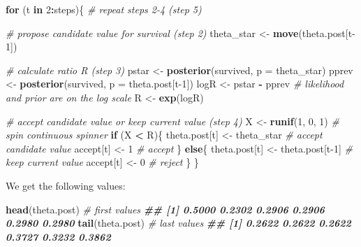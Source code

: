 \documentclass[
  12pt,
]{krantz}
\newenvironment{Shaded}{\begin{snugshade}}{\end{snugshade}}
\newcommand{\AttributeTok}[1]{\textcolor[rgb]{0.13,0.29,0.53}{#1}}
\newcommand{\CommentTok}[1]{\textcolor[rgb]{0.56,0.35,0.01}{\textit{#1}}}
\newcommand{\ControlFlowTok}[1]{\textcolor[rgb]{0.13,0.29,0.53}{\textbf{#1}}}
\newcommand{\DecValTok}[1]{\textcolor[rgb]{0.00,0.00,0.81}{#1}}
\newcommand{\DocumentationTok}[1]{\textcolor[rgb]{0.56,0.35,0.01}{\textbf{\textit{#1}}}}
\newcommand{\FunctionTok}[1]{\textcolor[rgb]{0.13,0.29,0.53}{\textbf{#1}}}
\newcommand{\NormalTok}[1]{#1}
\newcommand{\OtherTok}[1]{\textcolor[rgb]{0.56,0.35,0.01}{#1}}
\newcommand{\SpecialCharTok}[1]{\textcolor[rgb]{0.81,0.36,0.00}{\textbf{#1}}}
\begin{document}
\begin{Shaded}
\begin{Highlighting}[]
\ControlFlowTok{for}\NormalTok{ (t }\ControlFlowTok{in} \DecValTok{2}\SpecialCharTok{:}\NormalTok{steps)\{ }\CommentTok{\# repeat steps 2{-}4 (step 5)}
  
  \CommentTok{\# propose candidate value for survival (step 2)}
\NormalTok{  theta\_star }\OtherTok{\textless{}{-}} \FunctionTok{move}\NormalTok{(theta.post[t}\DecValTok{{-}1}\NormalTok{])}
  
  \CommentTok{\# calculate ratio R (step 3)}
\NormalTok{  pstar }\OtherTok{\textless{}{-}} \FunctionTok{posterior}\NormalTok{(survived, }\AttributeTok{p =}\NormalTok{ theta\_star)  }
\NormalTok{  pprev }\OtherTok{\textless{}{-}} \FunctionTok{posterior}\NormalTok{(survived, }\AttributeTok{p =}\NormalTok{ theta.post[t}\DecValTok{{-}1}\NormalTok{])}
\NormalTok{  logR }\OtherTok{\textless{}{-}}\NormalTok{ pstar }\SpecialCharTok{{-}}\NormalTok{ pprev }\CommentTok{\# likelihood and prior are on the log scale}
\NormalTok{  R }\OtherTok{\textless{}{-}} \FunctionTok{exp}\NormalTok{(logR)}
  
  \CommentTok{\# accept candidate value or keep current value (step 4)}
\NormalTok{  X }\OtherTok{\textless{}{-}} \FunctionTok{runif}\NormalTok{(}\DecValTok{1}\NormalTok{, }\DecValTok{0}\NormalTok{, }\DecValTok{1}\NormalTok{) }\CommentTok{\# spin continuous spinner}
  \ControlFlowTok{if}\NormalTok{ (X }\SpecialCharTok{\textless{}}\NormalTok{ R)\{}
\NormalTok{    theta.post[t] }\OtherTok{\textless{}{-}}\NormalTok{ theta\_star }\CommentTok{\# accept candidate value}
\NormalTok{    accept[t] }\OtherTok{\textless{}{-}} \DecValTok{1} \CommentTok{\# accept}
\NormalTok{  \}}
  \ControlFlowTok{else}\NormalTok{\{}
\NormalTok{    theta.post[t] }\OtherTok{\textless{}{-}}\NormalTok{ theta.post[t}\DecValTok{{-}1}\NormalTok{] }\CommentTok{\# keep current value}
\NormalTok{    accept[t] }\OtherTok{\textless{}{-}} \DecValTok{0} \CommentTok{\# reject}
\NormalTok{  \}}
\NormalTok{\}}
\end{Highlighting}
\end{Shaded}

We get the following values:

\begin{Shaded}
\begin{Highlighting}[]
\FunctionTok{head}\NormalTok{(theta.post) }\CommentTok{\# first values}
\DocumentationTok{\#\# [1] 0.5000 0.2302 0.2906 0.2906 0.2980 0.2980}
\FunctionTok{tail}\NormalTok{(theta.post) }\CommentTok{\# last values}
\DocumentationTok{\#\# [1] 0.2622 0.2622 0.2622 0.3727 0.3232 0.3862}
\end{Highlighting}
\end{Shaded}
\end{document}
